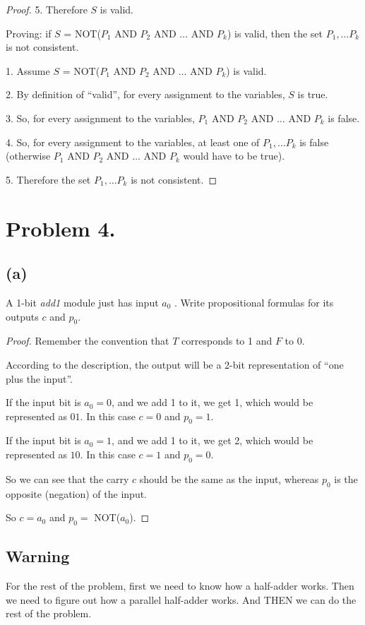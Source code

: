 \documentclass[14pt]{extarticle}
\begin{document}
\begin{proof}
5. Therefore $S$ is valid.

Proving: if $S$ = NOT($P_1$ AND $P_2$ AND $\ldots$ AND $P_k$) is valid, then the set $P_1, \ldots P_k$ is not consistent.

1. Assume $S$ = NOT($P_1$ AND $P_2$ AND $\ldots$ AND $P_k$) is valid.

2. By definition of ``valid'', for every assignment to the variables, $S$ is true.

3. So, for every assignment to the variables, $P_1$ AND $P_2$ AND $\ldots$ AND $P_k$ is false.

4. So, for every assignment to the variables, at least one of $P_1, \ldots P_k$ is false (otherwise $P_1$ AND $P_2$ AND $\ldots$ AND $P_k$ would have to be true).

5. Therefore the set $P_1, \ldots P_k$ is not consistent.
\end{proof}

\section{Problem 4.}
\subsection{(a)}
A 1-bit \textit{add1} module just has input $a_0$ . Write propositional formulas for its outputs $c$ and $p_0$.
\begin{proof}
Remember the convention that $T$ corresponds to 1 and $F$ to 0.

According to the description, the output will be a 2-bit representation of ``one plus the input''.

If the input bit is $a_0 = 0$, and we add 1 to it, we get 1, which would be represented as $01$. In this case $c = 0$ and $p_0 = 1$.

If the input bit is $a_0 = 1$, and we add 1 to it, we get 2, which would be represented as $10$. In this case $c = 1$ and $p_0 = 0$.

So we can see that the carry $c$ should be the same as the input, whereas $p_0$ is the opposite (negation) of the input.

So $c = a_0$ and $p_0 = $ NOT($a_0$).
\end{proof}

\subsection{Warning}
For the rest of the problem, first we need to know how a half-adder works. Then we need to figure out how a parallel half-adder works. And THEN we can do the rest of the problem. 
\end{document}
